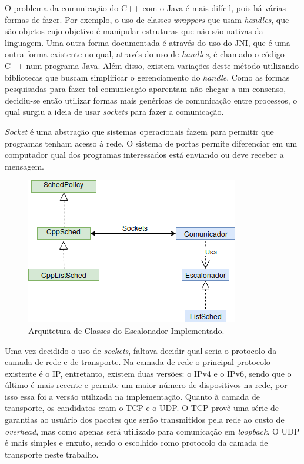 O problema da comunicação do C++ com o Java é mais difícil, pois há várias formas de fazer. Por exemplo, o uso de classes \textit{wrappers} que usam \textit{handles}, que são objetos cujo objetivo é manipular estruturas que não são nativas da linguagem\cite{CppJavaHandle}. Uma outra forma documentada é através do uso do \acrfull{JNI}, que é uma outra forma existente no qual, através do uso de \textit{handles}, é chamado o código C++ num programa Java\cite{CppJavaJNI}. Além disso, existem variações deste método utilizando bibliotecas que buscam simplificar o gerenciamento do \textit{handle}. Como as formas pesquisadas para fazer tal comunicação aparentam não chegar a um consenso, decidiu-se então utilizar formas mais genéricas de comunicação entre processos, o qual surgiu a ideia de usar \textit{sockets} para fazer a comunicação.

\textit{Socket} é uma abstração que sistemas operacionais fazem para permitir que programas tenham acesso à rede. O sistema de portas permite diferenciar em um computador qual dos programas interessados está enviando ou deve receber a mensagem. %

\begin{figure}[htbp]
	\centerline{\includegraphics[scale=0.7]{img/Proposta.png}}
	\caption{Arquitetura de Classes do Escalonador Implementado.}
	\label{ArquiteturaProposta}
\end{figure}

Uma vez decidido o uso de \textit{sockets}, faltava decidir qual seria o protocolo da camada de rede e de transporte. Na camada de rede o principal protocolo existente é o \acrfull{IP}, entretanto, existem duas versões: o IPv4\cite{ipv4rfc} e o IPv6\cite{ipv6rfc}, sendo que o último é mais recente e permite um maior número de dispositivos na rede, por isso essa foi a versão utilizada na implementação. Quanto à camada de transporte, os candidatos eram o \acrshort{TCP}\cite{tcp_rfc} e o \acrshort{UDP}\cite{udp_rfc}. O \acrshort{TCP} provê uma série de garantias ao usuário dos pacotes que serão transmitidos pela rede ao custo de \textit{overhead}, mas como apenas será utilizado para comunicação em \textit{loopback}. O \acrshort{UDP} é mais simples e enxuto, sendo o escolhido como protocolo da camada de transporte neste trabalho.

